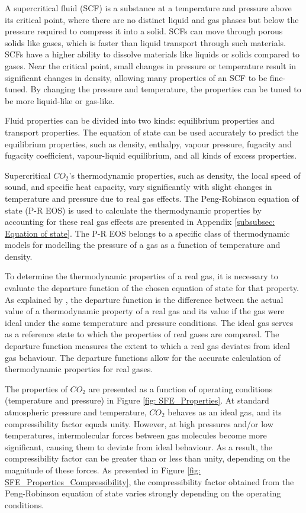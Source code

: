 \documentclass[../Article_Model_Parameters.tex]{subfiles}
\begin{document}
	
	A supercritical fluid (SCF) is a substance at a temperature and pressure above its critical point, where there are no distinct liquid and gas phases but below the pressure required to compress it into a solid. SCFs can move through porous solids like gases, which is faster than liquid transport through such materials. SCFs have a higher ability to dissolve materials like liquids or solids compared to gases. Near the critical point, small changes in pressure or temperature result in significant changes in density, allowing many properties of an SCF to be fine-tuned. By changing the pressure and temperature, the properties can be tuned to be more liquid-like or gas-like.

	Fluid properties can be divided into two kinds: equilibrium properties and transport properties. The equation of state can be used accurately to predict the equilibrium properties, such as density, enthalpy, vapour pressure, fugacity and fugacity coefficient, vapour-liquid equilibrium, and all kinds of excess properties.
	
	Supercritical $CO_2$'s thermodynamic properties, such as density, the local speed of sound, and specific heat capacity, vary significantly with slight changes in temperature and pressure due to real gas effects. The Peng-Robinson equation of state (P-R EOS) is used to calculate the thermodynamic properties by accounting for these real gas effects are presented in Appendix \ref{subsubsec: Equation of state}. The P-R EOS belongs to a specific class of thermodynamic models for modelling the pressure of a gas as a function of temperature and density.
	
	To determine the thermodynamic properties of a real gas, it is necessary to evaluate the departure function of the chosen equation of state for that property. As explained by \citet{Elliott2011}, the departure function is the difference between the actual value of a thermodynamic property of a real gas and its value if the gas were ideal under the same temperature and pressure conditions. The ideal gas serves as a reference state to which the properties of real gases are compared. The departure function measures the extent to which a real gas deviates from ideal gas behaviour. The departure functions allow for the accurate calculation of thermodynamic properties for real gases. %
	
	The properties of $CO_2$  are presented as a function of operating conditions (temperature and pressure) in Figure \ref{fig: SFE_Properties}. At standard atmospheric pressure and temperature, $CO_2$  behaves as an ideal gas, and its compressibility factor equals unity. However, at high pressures and/or low temperatures, intermolecular forces between gas molecules become more significant, causing them to deviate from ideal behaviour. As a result, the compressibility factor can be greater than or less than unity, depending on the magnitude of these forces. As presented in Figure \ref{fig: SFE_Properties_Compressibility}, the compressibility factor obtained from the Peng-Robinson equation of state varies strongly depending on the operating conditions. 
	
\end{document}
